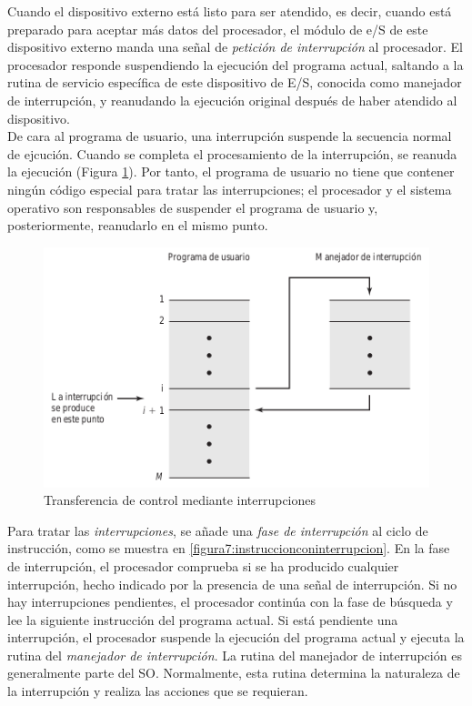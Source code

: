 \documentclass{article}
\begin{document}
					
					Cuando el dispositivo externo está listo para ser atendido, es decir, cuando está preparado para aceptar más datos del procesador, el módulo de e/S de este dispositivo externo manda una señal de \textit{petición de interrupción} al procesador. El procesador responde suspendiendo la ejecución del programa actual, saltando a la rutina de servicio específica de este dispositivo de E/S, conocida como manejador de interrupción, y reanudando la ejecución original después de haber atendido al dispositivo. \\
					
					De cara al programa de usuario, una interrupción suspende la secuencia normal de ejcución. Cuando se completa el procesamiento de la interrupción, se reanuda la ejecución (Figura \ref{figura6:transferenciacontrol}). Por tanto, el programa de usuario no tiene que contener ningún código especial para tratar las interrupciones; el procesador y el sistema operativo son responsables de suspender el programa de usuario y, posteriormente, reanudarlo en el mismo punto. \\
										
					\begin{figure}
					\caption{Transferencia de control mediante interrupciones}
					\label{figura6:transferenciacontrol}
					\centering
					\includegraphics[width=1\textwidth, scale=1]{figura6.png}
					\end{figure}
					
					Para tratar las \textit{interrupciones}, se añade una \textit{fase de interrupción} al ciclo de instrucción, como se muestra en \ref{figura7:instruccionconinterrupcion}. En la fase de interrupción, el procesador comprueba si se ha producido cualquier interrupción, hecho indicado por la presencia de una señal de interrupción. Si no hay interrupciones pendientes, el procesador continúa con la fase de búsqueda y lee la siguiente instrucción del programa actual. Si está pendiente una interrupción, el procesador suspende la ejecución del programa actual y ejecuta la rutina del \textit{manejador de interrupción}. La rutina del manejador de interrupción es generalmente parte del SO. Normalmente, esta rutina determina la naturaleza de la interrupción y realiza las acciones que se requieran. \\
					
\end{document}

